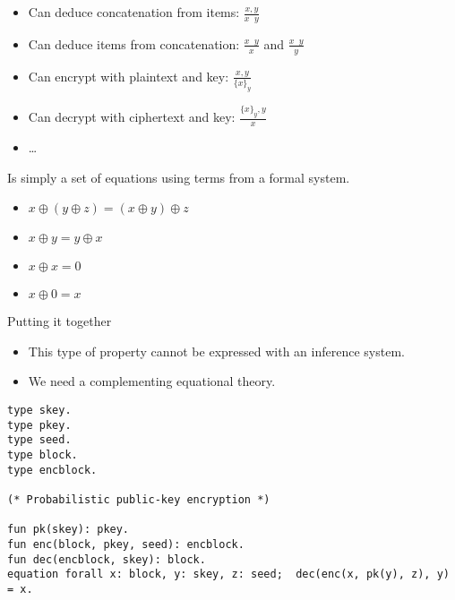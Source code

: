 \documentclass{beamer}
\theoremstyle{definition}
\theoremstyle{remark}
\DeclareMathOperator{\xor}{\oplus}
\DeclareMathOperator{\concat}{||}
\newcommand{\encrypt}[2]{\{#1\}_{#2}}
\begin{document}
\begin{frame}
  \begin{example}
    \begin{itemize}
      \item Can deduce concatenation from items: \(\frac{x, y}{x\concat y}\)
      \item Can deduce items from concatenation: \(\frac{x\concat y}{x}\) and 
        \(\frac{x\concat y}{y}\)
      \item Can encrypt with plaintext and key: \(\frac{x, y}{\encrypt{x}{y}}\)
      \item Can decrypt with ciphertext and key: \(\frac{\encrypt{x}{y}, 
            y}{x}\)
      \item \dots
    \end{itemize}
  \end{example}
\end{frame}

\begin{frame}
  \begin{definition}
    Is simply a set of equations using terms from a formal system.  
  \end{definition}

  \begin{example}
    \begin{itemize}
      \item \(x\xor ( y\xor z ) = ( x\xor y ) \xor z\)
      \item \(x \xor y = y\xor x\)
      \item \(x\xor x = 0\)
      \item \(x\xor 0 = x\)
    \end{itemize}
  \end{example}
\end{frame}

\begin{frame}
  \begin{alertblock}{Putting it together}
    \begin{itemize}
      \item This type of property cannot be expressed with an inference system.
      \item We need a complementing equational theory.
    \end{itemize}
  \end{alertblock}
\end{frame}

\begin{frame}[fragile]
  \begin{example}
    \begin{lstlisting}
type skey.
type pkey.
type seed.
type block.
type encblock.

(* Probabilistic public-key encryption *)

fun pk(skey): pkey.
fun enc(block, pkey, seed): encblock.
fun dec(encblock, skey): block.
equation forall x: block, y: skey, z: seed;  dec(enc(x, pk(y), z), y) = x.
    \end{lstlisting}
  \end{example}
\end{frame}
\end{document}
